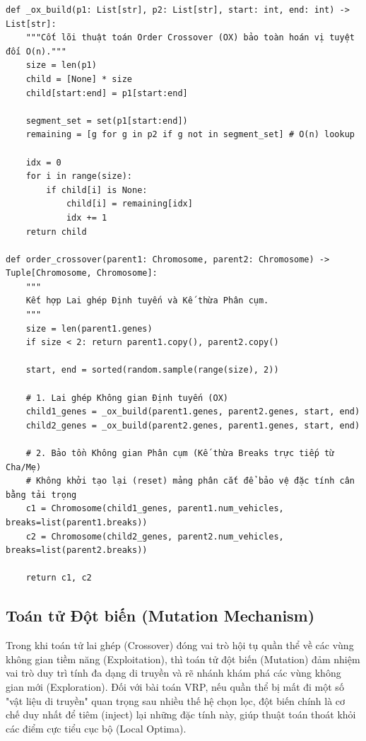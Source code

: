 \documentclass[12pt,a4paper]{article}
\numberwithin{figure}{subsection}
\numberwithin{table}{subsection}
\newcounter{codecounter}
\newenvironment{codeblock}[2]{%
    \refstepcounter{codecounter}%
    \phantomsection%
    \label{#1}%
    \par\smallskip
}{%
    \par\smallskip
}
\begin{document}
\begin{codeblock}{app:code:crossover}{Lai ghép thứ tự OX}
\begin{verbatim}
def _ox_build(p1: List[str], p2: List[str], start: int, end: int) -> List[str]:
    """Cốt lõi thuật toán Order Crossover (OX) bảo toàn hoán vị tuyệt đối O(n)."""
    size = len(p1)
    child = [None] * size
    child[start:end] = p1[start:end]
    
    segment_set = set(p1[start:end])
    remaining = [g for g in p2 if g not in segment_set] # O(n) lookup

    idx = 0
    for i in range(size):
        if child[i] is None:
            child[i] = remaining[idx]
            idx += 1
    return child

def order_crossover(parent1: Chromosome, parent2: Chromosome) -> Tuple[Chromosome, Chromosome]:
    """
    Kết hợp Lai ghép Định tuyến và Kế thừa Phân cụm.
    """
    size = len(parent1.genes)
    if size < 2: return parent1.copy(), parent2.copy()

    start, end = sorted(random.sample(range(size), 2))
    
    # 1. Lai ghép Không gian Định tuyến (OX)
    child1_genes = _ox_build(parent1.genes, parent2.genes, start, end)
    child2_genes = _ox_build(parent2.genes, parent1.genes, start, end)

    # 2. Bảo tồn Không gian Phân cụm (Kế thừa Breaks trực tiếp từ Cha/Mẹ)
    # Không khởi tạo lại (reset) mảng phân cắt để bảo vệ đặc tính cân bằng tải trọng
    c1 = Chromosome(child1_genes, parent1.num_vehicles, breaks=list(parent1.breaks))
    c2 = Chromosome(child2_genes, parent2.num_vehicles, breaks=list(parent2.breaks))

    return c1, c2
\end{verbatim}
\end{codeblock}




\subsection{Toán tử Đột biến (Mutation Mechanism)}

Trong khi toán tử lai ghép (Crossover) đóng vai trò hội tụ quần thể về các vùng không gian tiềm năng (Exploitation), thì toán tử đột biến (Mutation) đảm nhiệm vai trò duy trì tính đa dạng di truyền và rẽ nhánh khám phá các vùng không gian mới (Exploration). Đối với bài toán VRP, nếu quần thể bị mất đi một số "vật liệu di truyền" quan trọng sau nhiều thế hệ chọn lọc, đột biến chính là cơ chế duy nhất để tiêm (inject) lại những đặc tính này, giúp thuật toán thoát khỏi các điểm cực tiểu cục bộ (Local Optima).
\end{document}
